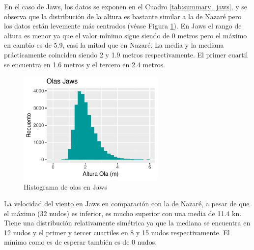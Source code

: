 En el caso de Jaws, los datos se exponen en el Cuadro \ref{tab:summary_jaws}, y se observa que la distribución de la altura es bastante similar a la de Nazaré pero los datos están levemente más centrados (véase Figura \ref{fig:hist_waves_jaws}). En Jaws el rango de altura es menor ya que el valor mínimo sigue siendo de 0 metros pero el máximo en cambio es de 5.9, casi la mitad que en Nazaré. La media y la mediana prácticamente coinciden siendo 2 y 1.9 metros respectivamente. El primer cuartil se encuentra en 1.6 metros y el tercero en 2.4 metros.

\begin{figure}[H]
    \centering
    \includegraphics[height=5.6cm]{./figures/jaws_hist_wave.pdf}
    \caption{Histograma de olas en Jaws}
    \label{fig:hist_waves_jaws}
\end{figure}

La velocidad del viento en Jaws en comparación con la de Nazaré, a pesar de que el máximo (32 nudos) es inferior, es mucho superior con una media de 11.4 \si{\knot}. Tiene una distribución relativamente simétrica ya que la mediana se encuentra en 12 nudos y el primer y tercer cuartiles en 8 y 15 nudos respectivamente. El mínimo como es de esperar también es de 0 nudos.

